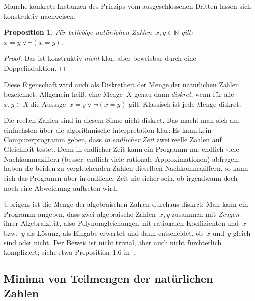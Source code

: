 \documentclass[a4paper,ngerman,12pt]{scrartcl}
\theoremstyle{definition}
\theoremstyle{plain}
\newtheorem{prop}[defn]{Proposition}
\theoremstyle{remark}
\newcommand{\NN}{\mathbb{N}}
\renewcommand{\_}{\mathpunct{.}\,}
\newcommand{\?}{\,{:}\,}
\begin{document}
Manche konkrete Instanzen des Prinzips vom ausgeschlossenen Dritten lassen sich
konstruktiv nachweisen:

\begin{prop}\label{natdiskret}Für beliebige natürlichen Zahlen~$x,y \in \NN$
gilt: $x = y \vee \neg(x = y)$.\end{prop}
\begin{proof}Das ist konstruktiv \emph{nicht} klar, aber beweisbar durch eine
Doppelinduktion.\end{proof}

Diese Eigenschaft wird auch als Diskretheit der Menge der natürlichen Zahlen
bezeichnet: Allgemein heißt eine Menge~$X$ genau dann \emph{diskret}, wenn für
alle~$x,y \in X$ die Aussage~$x = y \vee \neg(x = y)$ gilt. Klassisch ist jede
Menge diskret.

Die reellen Zahlen sind in diesem Sinne nicht diskret. Das macht
man sich am einfachsten über die algorithmische Interpretation klar: Es kann
kein Computerprogramm geben, dass \emph{in endlicher Zeit} zwei reelle Zahlen
auf Gleichheit testet. Denn in endlicher Zeit kann ein Programm nur endlich viele
Nachkommaziffern (besser: endlich viele rationale Approximationen) abfragen;
haben die beiden zu vergleichenden Zahlen dieselben Nachkommaziffern, so kann
sich das Programm aber in endlicher Zeit nie sicher sein, ob irgendwann doch noch
eine Abweichung auftreten wird.

Übrigens ist die Menge der algebraischen Zahlen durchaus diskret:
Man kann ein
Programm angeben, dass zwei algebraische Zahlen~$x,y$ zusammen mit \emph{Zeugen}
ihrer Algebraizität, also Polynomgleichungen mit rationalen Koeffizienten
und~$x$ bzw.~$y$ als Lösung, als Eingabe erwartet und dann entscheidet, ob~$x$
und~$y$ gleich sind oder nicht. Der Beweis ist nicht trivial, aber auch nicht
fürchterlich kompliziert; siehe etwa Proposition~1.6 in~\cite{nw:algebra}.


\subsection{Minima von Teilmengen der natürlichen Zahlen}
\end{document}
